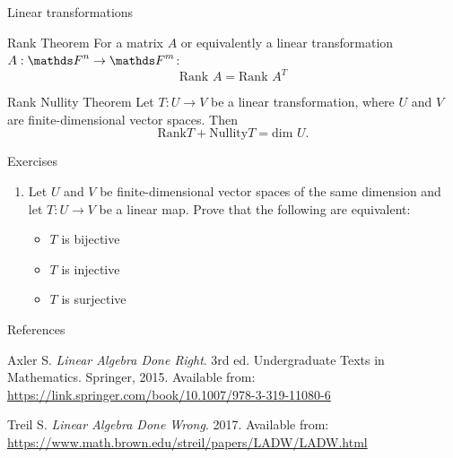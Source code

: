 \documentclass [aspectratio=169]{beamer}
\begin{document}
\begin{frame}{Linear transformations}
\begin{exampleblock}{Rank Theorem}
For a matrix $A$ or equivalently a linear transformation $A: \F^n \to \F^m$:
\begin{equation*}
\text{Rank } A = \text{Rank }  A^T 
\end{equation*}
\end{exampleblock}

\begin{exampleblock}{Rank Nullity Theorem}
Let $T:U \to V$ be a linear transformation, where $U$ and $V$ are finite-dimensional vector spaces. Then  
\begin{equation*}
\text{Rank} T + \text{Nullity}  T = \text{dim } U.
\end{equation*}
\end{exampleblock}

\end{frame}

\begin{frame}{Exercises}
\begin{enumerate}
\item Let $U$ and $V$ be finite-dimensional vector spaces of the same dimension and let $T: U \to V$ be a linear map. Prove that the following are equivalent:
\begin{itemize}
\item $T$ is bijective 
\item $T$ is injective
\item $T$ is surjective
\end{itemize}
\end{enumerate}

\end{frame}


\begin{frame}{References}

Axler S. \textit{Linear Algebra Done Right}. 3rd ed. Undergraduate Texts in Mathematics. Springer, 2015.
Available from: \href{https://link.springer.com/book/10.1007/978-3-319-11080-6}{https://link.springer.com/book/10.1007/978-3-319-11080-6} 

\vspace{1em}


\indent Treil S. \textit{Linear Algebra Done Wrong}. 2017. Available from: \href{https://www.math.brown.edu/streil/papers/LADW/LADW.html}{https://www.math.brown.edu/streil/papers/LADW/LADW.html}
\end{frame}
\end{document}
